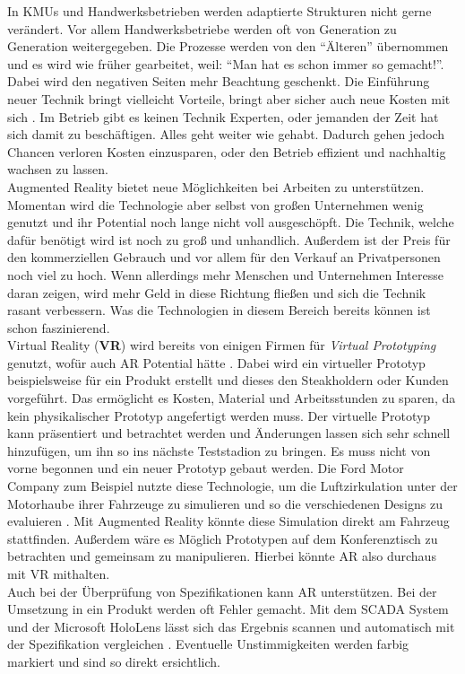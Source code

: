 In KMUs und Handwerksbetrieben werden adaptierte Strukturen nicht gerne verändert. Vor allem Handwerksbetriebe werden oft von Generation zu Generation weitergegeben. Die Prozesse werden von den \enquote{Älteren} übernommen und es wird wie früher gearbeitet, weil: \enquote{Man hat es schon immer so gemacht!}. Dabei wird den negativen Seiten mehr Beachtung geschenkt. Die Einführung neuer Technik bringt vielleicht Vorteile, bringt aber sicher auch neue Kosten mit sich \cite{hateful_six_krcmar}. Im Betrieb gibt es keinen Technik Experten, oder jemanden der Zeit hat sich damit zu beschäftigen. Alles geht weiter wie gehabt. Dadurch gehen jedoch Chancen verloren Kosten einzusparen, oder den Betrieb effizient und nachhaltig wachsen zu lassen. \\
Augmented Reality bietet neue Möglichkeiten bei Arbeiten zu unterstützen. Momentan wird die Technologie aber selbst von großen Unternehmen wenig genutzt und ihr Potential noch lange nicht voll ausgeschöpft. Die Technik, welche dafür benötigt wird ist noch zu groß und unhandlich. Außerdem ist der Preis für den kommerziellen Gebrauch und vor allem für den Verkauf an Privatpersonen noch viel zu hoch. Wenn allerdings mehr Menschen und Unternehmen Interesse daran zeigen, wird mehr Geld in diese Richtung fließen und sich die Technik rasant verbessern. Was die Technologien in diesem Bereich bereits können ist schon faszinierend. \\
Virtual Reality (\textbf{VR}) wird bereits von einigen Firmen für \textit{Virtual Prototyping} genutzt, wofür auch AR Potential hätte \cite{lu_virtual_1999}. Dabei wird ein virtueller Prototyp beispielsweise für ein Produkt erstellt und dieses den Steakholdern oder Kunden vorgeführt. Das ermöglicht es Kosten, Material und Arbeitsstunden zu sparen, da kein physikalischer Prototyp angefertigt werden muss. Der virtuelle Prototyp kann präsentiert und betrachtet werden und Änderungen lassen sich sehr schnell hinzufügen, um ihn so ins nächste Teststadion zu bringen. Es muss nicht von vorne begonnen und ein neuer Prototyp gebaut werden. Die Ford Motor Company zum Beispiel nutzte diese Technologie, um die Luftzirkulation unter der Motorhaube ihrer Fahrzeuge zu simulieren und so die verschiedenen Designs zu evaluieren \cite{lu_virtual_1999}. Mit Augmented Reality könnte diese Simulation direkt am Fahrzeug stattfinden. Außerdem wäre es Möglich Prototypen auf dem Konferenztisch zu betrachten und gemeinsam zu manipulieren. Hierbei könnte AR also durchaus mit VR mithalten. \\
Auch bei der Überprüfung von Spezifikationen kann AR unterstützen. Bei der Umsetzung in ein Produkt werden oft Fehler gemacht. Mit dem SCADA System und der Microsoft HoloLens lässt sich das Ergebnis scannen und automatisch mit der Spezifikation vergleichen \cite{georgel_industrial_2007}. Eventuelle Unstimmigkeiten werden farbig markiert und sind so direkt ersichtlich. \\
